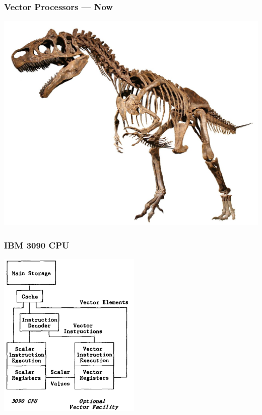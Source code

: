 \documentclass[xcolor={x11names,svgnames}]{beamer}
\begin{document}

\begin{frame}
  \frametitle{Vector Processors --- Now}
  \centering
  \includegraphics[width=\textwidth]{dino.jpg}

\end{frame}



\begin{frame}
  \frametitle{IBM 3090 CPU}

  \centering
  \includegraphics[height=8cm]{ibm_3090.jpg}  
\end{frame}

\end{document}
